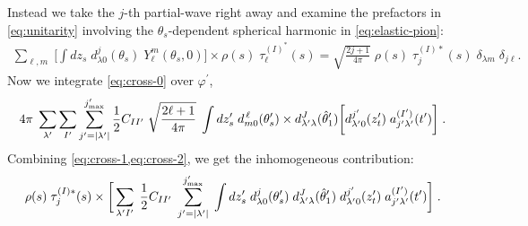 Instead we take the \(j\)-th partial-wave right away and examine the prefactors in \cref{eq:unitarity} involving the \(\theta_s\)-dependent spherical harmonic in \cref{eq:elastic-pion}:
  \begin{align}
    \label{eq:cross-1}
    \sum_{\ell, m} \;
      \bigg[
       \int dz_s \;
      d_{\lambda 0}^j(\theta_s) \; Y^m_\ell(\theta_s,0)
       \bigg]
        \times \rho(s) \; {\tau}^{(I)^*}_\ell(s)
  = \sqrt{\frac{2j+1}{4\pi}} \; \rho(s) \; \tau_j^{(I)*}(s) \; \delta_{\lambda m} \; \delta_{j \ell}.
  \end{align}
Now we integrate \cref{eq:cross-0} over \(\varphi^\prime\),
  \begin{align}
    \label{eq:cross-2}
    4\pi \; \sum_{\lambda^\prime} \sum_{I^\prime} \sum_{{j^\prime}=|{\lambda^\prime}|}^{j^\prime_\text{max}}  \frac{1}{2}C_{II^\prime} \; \sqrt{\frac{2\ell+1}{4\pi}} \;
     \int dz_s^\prime \; d_{m0}^{\,\ell}(\theta_s^\prime)
     \times
      d_{{\lambda^\prime} \lambda}^J(\hat{\theta}^\prime_1)
     \bigg[
      d_{{\lambda^\prime} 0}^{j^\prime}(z_t^\prime) \; a^{({I^\prime})}_{j^\prime{\lambda^\prime}}(t^\prime)
     \bigg] \; .
  \end{align}
Combining \cref{eq:cross-1,eq:cross-2}, we get the inhomogeneous contribution:
  \begin{align}
      \label{eq:pw-cross}
     \rho(s) \; \tau^{(I)*}_j(s) \times
     \bigg[
      \sum_{{\lambda^\prime} {I^\prime}} \; \frac{1}{2}C_{I{I^\prime}} \; \sum_{{j^\prime}=|{\lambda^\prime}|}^{j^\prime_\text{max}} \;
      \int d z_s^\prime \; d_{\lambda0}^j(\theta^\prime_s) \;
      d_{{\lambda^\prime} \lambda}^J(\hat{\theta}^\prime_1) \; d_{{\lambda^\prime} 0}^{j^\prime}(z_t^\prime) \; a^{({I^\prime})}_{{j^\prime} {\lambda^\prime}}(t^\prime)
      \bigg] \; .
  \end{align}

